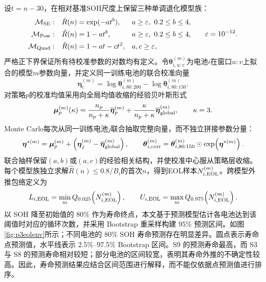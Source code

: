 \documentclass[withoutpreface]{cumcmthesis}
\begin{document}
设$t=n-30$，在相对基准SOH尺度上保留三种单调退化模型族：
\begin{equation}
\begin{aligned}
\mathcal M_{\rm SE}:&\quad \hat R(n)=\exp(-at^b), &&a\ge\varepsilon,\ 0.2\le b\le4,\\
\mathcal M_{\rm Pow}:&\quad \hat R(n)=1-at^b, &&a\ge\varepsilon,\ 0.2\le b\le4,\\
\mathcal M_{\rm Quad}:&\quad \hat R(n)=1-at-ct^2, &&a,c\ge\varepsilon,
\end{aligned}
\qquad \varepsilon=10^{-12}.
\label{eq:p3-eol-families}
\end{equation}
严格正下界保证所有待校准参数的对数均有定义。令$\boldsymbol\theta_{i,u:v}^{(m)}$为电池$i$在窗口$u{:}v$上拟合的模型$m$参数向量，并定义同一训练电池的联合校准向量
\begin{equation}
\boldsymbol\eta_i^{(m)}=\log\boldsymbol\theta_{i,80:200}^{(m)}-
\log\boldsymbol\theta_{i,80:150}^{(m)}.
\label{eq:p3-eta}
\end{equation}
对策略$p$的校准均值采用向全局均值收缩的经验贝叶斯形式
\begin{equation}
\boldsymbol\mu_p^{(m)}(\kappa)=\frac{n_p}{n_p+\kappa}\overline{\boldsymbol\eta}_p^{(m)}+
\frac{\kappa}{n_p+\kappa}\overline{\boldsymbol\eta}_{\rm global}^{(m)},\qquad \kappa=3.
\label{eq:p3-eb}
\end{equation}
Monte Carlo每次从同一训练电池$j$联合抽取完整向量，而不独立拼接参数分量：
\begin{equation}
\boldsymbol\eta^{*(m)}=\boldsymbol\mu_p^{(m)}+
\left(\boldsymbol\eta_j^{(m)}-\overline{\boldsymbol\eta}_{\rm global}^{(m)}\right),\qquad
\boldsymbol\theta_{i,\rm corr}^{(m)}=\boldsymbol\theta_{i,80:150}^{(m)}\odot
\exp\!\left(\boldsymbol\eta^{*(m)}\right).
\label{eq:p3-joint-calibration}
\end{equation}
联合抽样保留$(a,b)$或$(a,c)$的经验相关结构，并使校准中心服从策略层收缩。每个模型族独立求解$\hat R(n)\le0.8/B_i$的首次$n$，得到EOL样本$N_{i,\rm EOL}^{(m)}$。跨模型外推包络定义为
\begin{equation}
L_{i,\rm EOL}=\min_m Q_{0.025}\!\left(N_{i,\rm EOL}^{(m)}\right),\qquad
U_{i,\rm EOL}=\max_m Q_{0.975}\!\left(N_{i,\rm EOL}^{(m)}\right).
\label{eq:p3-envelope}
\end{equation}
以 SOH 降至初始值的 80\% 作为寿命终点，本文基于预测模型估计各电池达到该阈值时对应的循环次数，并采用 Bootstrap 重采样构建 95\% 预测区间。如图\ref{fig:p3eolenv}所示；不同电池的 80\% SOH 寿命预测存在明显差异。圆点表示寿命点预测值，水平线表示 2.5\%–97.5\% Bootstrap 区间。S9 的预测寿命最高，而 S3 与 S8 的预测寿命相对较短；部分电池的区间较宽，表明其寿命外推的不确定性较高。因此，寿命预测结果应结合区间范围进行解释，而不能仅依据点预测值进行排序。
\end{document}
